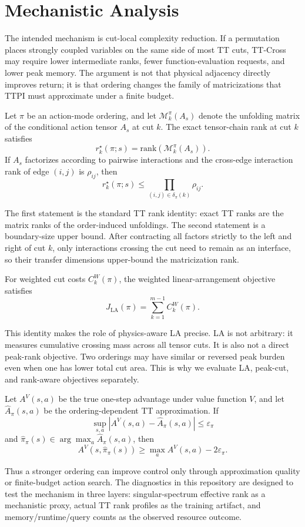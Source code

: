 \section{Mechanistic Analysis}

The intended mechanism is cut-local complexity reduction. If a permutation
places strongly coupled variables on the same side of most TT cuts, TT-Cross may
require lower intermediate ranks, fewer function-evaluation requests, and lower
peak memory. The argument is not that physical adjacency directly improves
return; it is that ordering changes the family of matricizations that TTPI must
approximate under a finite budget.

\begin{proposition}
Let \(\pi\) be an action-mode ordering, and let
\(\mathcal{M}_k^\pi(A_s)\) denote the unfolding matrix of the conditional
action tensor \(A_s\) at cut \(k\). The exact tensor-chain rank at cut \(k\)
satisfies
\[
r_k^\star(\pi;s)=\mathrm{rank}(\mathcal{M}_k^\pi(A_s)).
\]
If \(A_s\) factorizes according to pairwise interactions and the cross-edge
interaction rank of edge \((i,j)\) is \(\rho_{ij}\), then
\[
r_k^\star(\pi;s)\le \prod_{(i,j)\in\delta_\pi(k)} \rho_{ij}.
\]
\end{proposition}

The first statement is the standard TT rank identity: exact TT ranks are the
matrix ranks of the order-induced unfoldings. The second statement is a
boundary-size upper bound. After contracting all factors strictly to the left
and right of cut \(k\), only interactions crossing the cut need to remain as an
interface, so their transfer dimensions upper-bound the matricization rank.

\begin{lemma}
For weighted cut costs \(C_k^W(\pi)\), the weighted linear-arrangement objective
satisfies
\[
J_{\mathrm{LA}}(\pi)=\sum_{k=1}^{m-1} C_k^W(\pi).
\]
\end{lemma}

This identity makes the role of physics-aware LA precise. LA is not arbitrary:
it measures cumulative crossing mass across all tensor cuts. It is also not a
direct peak-rank objective. Two orderings may have similar or reversed peak
burden even when one has lower total cut area. This is why we evaluate LA,
peak-cut, and rank-aware objectives separately.

\begin{lemma}
Let \(A^V(s,a)\) be the true one-step advantage under value function \(V\), and
let \(\widehat A_\pi(s,a)\) be the ordering-dependent TT approximation. If
\[
\sup_{s,a}|A^V(s,a)-\widehat A_\pi(s,a)|\le \varepsilon_\pi
\]
and \(\widehat \pi_\pi(s)\in\arg\max_a \widehat A_\pi(s,a)\), then
\[
A^V(s,\widehat \pi_\pi(s))\ge \max_a A^V(s,a)-2\varepsilon_\pi .
\]
\end{lemma}

Thus a stronger ordering can improve control only through approximation quality
or finite-budget action search. The diagnostics in this repository are designed
to test the mechanism in three layers: singular-spectrum effective rank as a
mechanistic proxy, actual TT rank profiles as the training artifact, and
memory/runtime/query counts as the observed resource outcome.

